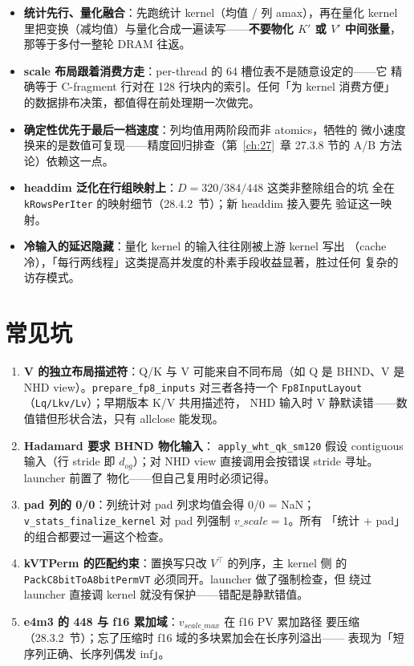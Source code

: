 \begin{itemize}[itemsep=1pt,topsep=2pt]
  \item \textbf{统计先行、量化融合}：先跑统计 kernel（均值 / 列 amax），再在量化
        kernel 里把变换（减均值）与量化合成一遍读写——\textbf{不要物化
        $K'$ 或 $V'$ 中间张量}，那等于多付一整轮 DRAM 往返。
  \item \textbf{scale 布局跟着消费方走}：per-thread 的 64 槽位表不是随意设定的——它
        精确等于 C-fragment 行对在 128 行块内的索引。任何「为 kernel 消费方便」
        的数据排布决策，都值得在前处理期一次做完。
  \item \textbf{确定性优先于最后一档速度}：列均值用两阶段而非 atomics，牺牲的
        微小速度换来的是数值可复现——精度回归排查（第~\ref{ch:27}~章 27.3.8
        节的 A/B 方法论）依赖这一点。
  \item \textbf{headdim 泛化在行组映射上}：$D=320/384/448$ 这类非整除组合的坑
        全在 \texttt{kRowsPerIter} 的映射细节（28.4.2~节）；新 headdim 接入要先
        验证这一映射。
  \item \textbf{冷输入的延迟隐藏}：量化 kernel 的输入往往刚被上游 kernel 写出
        （cache 冷），「每行两线程」这类提高并发度的朴素手段收益显著，胜过任何
        复杂的访存模式。
\end{itemize}

\section{常见坑}

\begin{enumerate}[itemsep=1pt,topsep=2pt]
  \item \textbf{V 的独立布局描述符}：Q/K 与 V 可能来自不同布局（如 Q 是
        BHND、V 是 NHD view）。\texttt{prepare\_fp8\_inputs} 对三者各持一个
        \texttt{Fp8InputLayout}（\texttt{Lq/Lkv/Lv}）；早期版本 K/V 共用描述符，
        NHD 输入时 V 静默读错——数值错但形状合法，只有 allclose 能发现。
  \item \textbf{Hadamard 要求 BHND 物化输入}：
        \texttt{apply\_wht\_qk\_sm120} 假设 contiguous 输入（行 stride 即
        $d_{og}$）；对 NHD view 直接调用会按错误 stride 寻址。launcher 前置了
        物化——但自己复用时必须记得。
  \item \textbf{pad 列的 0/0}：列统计对 pad 列求均值会得 0/0 = NaN；
        \texttt{v\_stats\_finalize\_kernel} 对 pad 列强制 $v\_scale = 1$。所有
        「统计 + pad」的组合都要过一遍这个检查。
  \item \textbf{kVTPerm 的匹配约束}：置换写只改 $V^{\top}$ 的列序，主 kernel 侧
        的 \texttt{PackC8bitToA8bitPermVT} 必须同开。launcher 做了强制检查，但
        绕过 launcher 直接调 kernel 就没有保护——错配是静默错值。
  \item \textbf{e4m3 的 448 与 f16 累加域}：$v_{scale\_max}$ 在 f16 PV 累加路径
        要压缩（28.3.2~节）；忘了压缩时 f16 域的多块累加会在长序列溢出——
        表现为「短序列正确、长序列偶发 inf」。
\end{enumerate}

